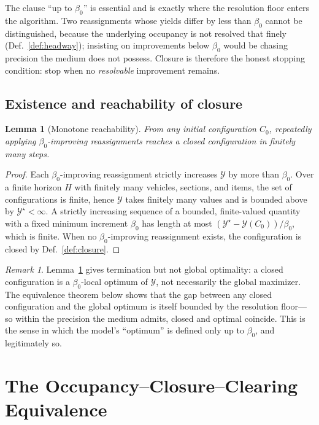 \documentclass[11pt,twocolumn,a4paper]{article}
\newtheorem{lemma}[theorem]{Lemma}
\theoremstyle{definition}
\theoremstyle{remark}
\newtheorem{remark}[theorem]{Remark}
\newcommand{\yield}{\mathcal{Y}}
\newcommand{\blocktime}{\beta_0}
\begin{document}
The clause ``up to $\blocktime$'' is essential and is exactly where the resolution floor enters the algorithm. Two reassignments whose yields differ by less than $\blocktime$ cannot be distinguished, because the underlying occupancy is not resolved that finely (Def.~\ref{def:headway}); insisting on improvements below $\blocktime$ would be chasing precision the medium does not possess. Closure is therefore the honest stopping condition: stop when no \emph{resolvable} improvement remains.

\subsection{Existence and reachability of closure}

\begin{lemma}[Monotone reachability]
\label{lem:reach}
From any initial configuration $C_0$, repeatedly applying $\blocktime$-improving reassignments reaches a closed configuration in finitely many steps.
\end{lemma}

\begin{proof}
Each $\blocktime$-improving reassignment strictly increases $\yield$ by more than $\blocktime$. Over a finite horizon $H$ with finitely many vehicles, sections, and items, the set of configurations is finite, hence $\yield$ takes finitely many values and is bounded above by $\yield^{\star}<\infty$. A strictly increasing sequence of a bounded, finite-valued quantity with a fixed minimum increment $\blocktime$ has length at most $(\yield^{\star}-\yield(C_0))/\blocktime$, which is finite. When no $\blocktime$-improving reassignment exists, the configuration is closed by Def.~\ref{def:closure}.
\end{proof}

\begin{remark}
Lemma~\ref{lem:reach} gives termination but not global optimality: a closed configuration is a $\blocktime$-local optimum of $\yield$, not necessarily the global maximizer. The equivalence theorem below shows that the gap between any closed configuration and the global optimum is itself bounded by the resolution floor---so within the precision the medium admits, closed and optimal coincide. This is the sense in which the model's ``optimum'' is defined only up to $\blocktime$, and legitimately so.
\end{remark}

\section{The Occupancy--Closure--Clearing Equivalence}
\label{sec:equivalence}
\end{document}
